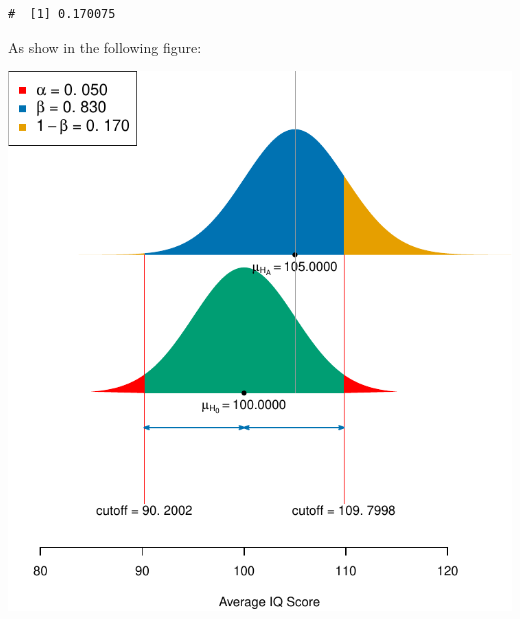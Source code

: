 \documentclass[letterpaper,11pt,twoside,]{pinp}
\begin{document}
\begin{Shaded}
\begin{Highlighting}[]
\SpecialCharTok{+}
\end{Highlighting}
\end{Shaded}

\begin{ShadedResult}
\begin{verbatim}
#  [1] 0.170075
\end{verbatim}
\end{ShadedResult}

As show in the following figure:

\begin{Shaded}
\begin{Highlighting}[]
\NormalTok{(} \NormalTok{, } \NormalTok{, } \NormalTok{, } \NormalTok{,}
            \NormalTok{(}\NormalTok{(}\NormalTok{, }\NormalTok{), }\NormalTok{, } \SpecialCharTok{/} \NormalTok{(}\NormalTok{)),}
            \NormalTok{, } \NormalTok{)}
\end{Highlighting}
\end{Shaded}

\begin{center}\includegraphics{006-power-solutions_files/figure-latex/unnamed-chunk-8-1} \end{center}
\end{document}
